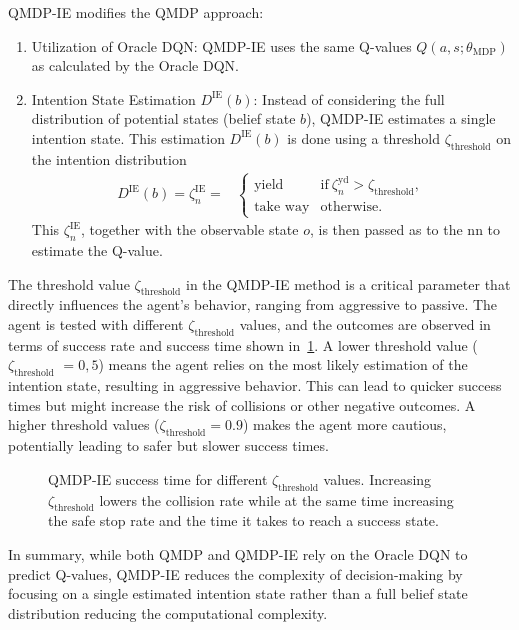 QMDP-IE modifies the QMDP approach:
\begin{enumerate}
	\item Utilization of Oracle DQN: QMDP-IE uses the same Q-values $Q(a,s;\theta_\mathrm{MDP})$ as calculated by the Oracle DQN.
	\item Intention State Estimation $D^\mathrm{IE}(b)$: Instead of considering the full distribution of potential states (belief state $b$), QMDP-IE estimates a single intention state. This estimation $D^\mathrm{IE}(b)$ is done using a threshold $\zeta_\mathrm{threshold}$ on the intention distribution
	\begin{align}
		D^\mathrm{IE}(b) = \zeta^\mathrm{IE}_n = & \begin{cases}
		\text{yield} & \text{if} \ \zeta_n^\text{yd} > \zeta_\text{threshold},\\
		\text{take way} & \text{otherwise.}
		\label{eq:IE_i}
		\end{cases} 
	\end{align}
	This $\zeta^\mathrm{IE}_n$, together with the observable state $o$, is then passed as to the \gls{nn} to estimate the Q-value.
\end{enumerate}
The threshold value $\zeta_\mathrm{threshold}$ in the QMDP-IE method is a critical parameter that directly influences the agent's behavior, ranging from aggressive to passive. The agent is tested with different $\zeta_\mathrm{threshold}$ values, and the outcomes are observed in terms of success rate and success time shown in~\ref{fig:thesis_intent_threshold}.
A lower threshold value ($\zeta_\mathrm{threshold}$ $= 0,5$) means the agent relies on the most likely estimation of the intention state, resulting in aggressive behavior. This can lead to quicker success times but might increase the risk of collisions or other negative outcomes. A higher threshold values ($\zeta_\mathrm{threshold}=0.9$) makes the agent more cautious, potentially leading to safer but slower success times.
\begin{figure}[ht]
	\centering
			
			\vspace{-0.8cm}
			\caption{QMDP-IE success time for different $\zeta_\mathrm{threshold}$ values. Increasing $\zeta_\mathrm{threshold}$ lowers the collision rate while at the same time increasing the safe stop rate and the time it takes to reach a success state.}
	\label{fig:thesis_intent_threshold}
\end{figure}
In summary, while both QMDP and QMDP-IE rely on the Oracle DQN to predict Q-values, QMDP-IE reduces the complexity of decision-making by focusing on a single estimated intention state rather than a full belief state distribution reducing the computational complexity.

